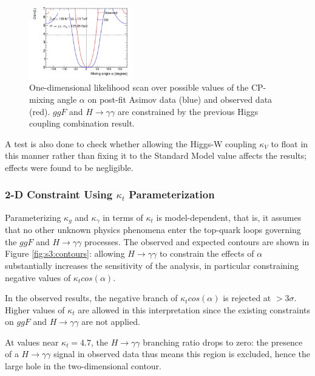 \begin{figure}[htbp]
  \centering
  \includegraphics[width=0.4\textwidth]{figures/tthcp_results/nllscan_alpha_expobs_scale.pdf}
  \caption{One-dimensional likelihood scan over possible values of the CP-mixing angle $\alpha$ on post-fit Asimov data (blue) and observed data (red). $ggF$ and $H \rightarrow \gamma\gamma$ are constrained by the previous Higgs coupling combination result.
  \label{fig:alphascan_expobs_scale}}
\end{figure}

A test is also done to check whether allowing the Higgs-W coupling $\kappa_{V}$ to float in this manner rather than fixing it to the Standard Model value affects the results; effects were found to be negligible.

\subsubsection{2-D Constraint Using $\kappa_{t}$ Parameterization}

Parameterizing $\kappa_{g}$ and $\kappa_{\gamma}$ in terms of $\kappa_{t}$ is model-dependent, that is, it assumes that no other unknown physics phenomena enter the top-quark loops governing the $ggF$ and $H \rightarrow \gamma \gamma$ processes. The observed and expected contours are shown in Figure \ref{fig:s3:contours}: allowing $H \rightarrow \gamma \gamma$ to constrain the effects of $\alpha$ substantially increases the sensitivity of the analysis, in particular constraining negative values of $\kappa_{t} cos(\alpha)$.

In the observed results, the negative branch of $\kappa_{t}cos(\alpha)$ is rejected at $> 3\sigma$. Higher values of $\kappa_{t}$ are allowed in this interpretation since the existing constraints on $ggF$ and $H \rightarrow \gamma \gamma$ are not applied.

At values near $\kappa_{t} = 4.7$, the $H \rightarrow \gamma \gamma$ branching ratio drops to zero: the presence of a $H \rightarrow \gamma \gamma$ signal in observed data thus means this region is excluded, hence the large hole in the two-dimensional contour.

